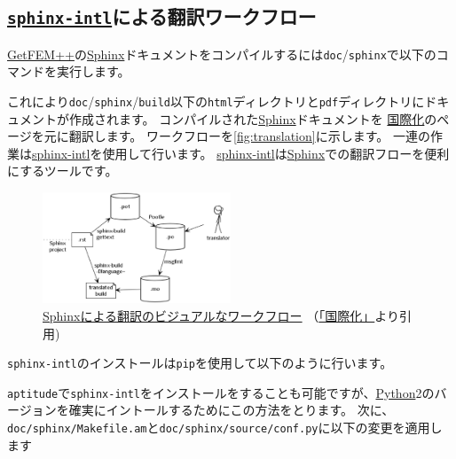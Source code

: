 \documentclass{../../style/ltjoc}
\begin{document}
\subsection{\href{https://pypi.org/project/sphinx-intl/}{\texttt{sphinx-intl}}による翻訳ワークフロー}
\href{http://getfem.org}{GetFEM++}の\href{http://www.sphinx-doc.org/ja/stable/}{Sphinx}ドキュメントをコンパイルするには\texttt{doc}/\texttt{sphinx}で以下のコマンドを実行します。
\begin{shbox}
\end{shbox}
これにより\texttt{doc}/\texttt{sphinx}/\texttt{build}以下の\texttt{html}ディレクトリと\texttt{pdf}ディレクトリにドキュメントが作成されます。
コンパイルされた\href{http://www.sphinx-doc.org/ja/stable/}{Sphinx}ドキュメントを
\href{http://www.sphinx-doc.org/ja/stable/intl.html}{国際化}のページを元に翻訳します。
ワークフローを\autoref{fig:translation}に示します。
一連の作業は\href{https://pypi.org/project/sphinx-intl/}{sphinx-intl}を使用して行います。
\href{https://pypi.org/project/sphinx-intl/}{sphinx-intl}は\href{http://www.sphinx-doc.org/ja/stable/}{Sphinx}での翻訳フローを便利にするツールです。
\begin{figure}[htbp]
\centering
\includegraphics[width=0.5\textwidth]{fig/translation.eps}
\caption{\href{http://www.sphinx-doc.org/ja/stable/_images/translation.png}{Sphinxによる翻訳のビジュアルなワークフロー}
（\href{http://www.sphinx-doc.org/ja/stable/intl.html}{「国際化」}より引用)}
\label{fig:translation}
\end{figure}
\texttt{sphinx-intl}のインストールは\texttt{pip}を使用して以下のように行います。
\begin{shbox}
\end{shbox}
\texttt{aptitude}で\texttt{sphinx-intl}をインストールをすることも可能ですが、\href{https://www.python.org/}{Python}2のバージョンを確実にイントールするためにこの方法をとります。
次に、\texttt{doc/sphinx/Makefile.am}と\texttt{doc/sphinx/source/conf.py}に以下の変更を適用します
\end{document}
